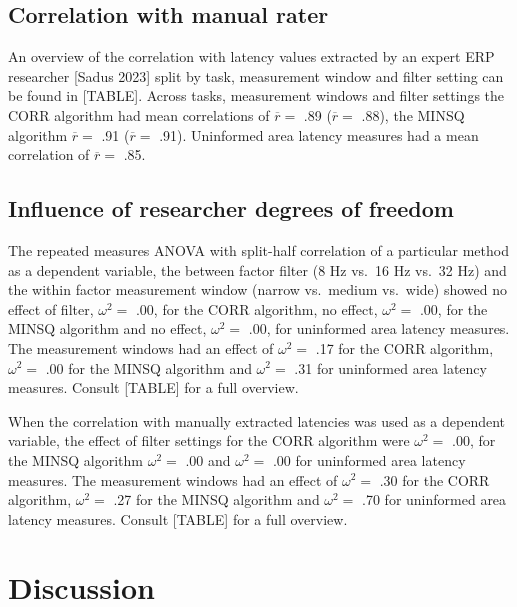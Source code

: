 \documentclass[
  man,floatsintext]{apa7}
\begin{document}
\hypertarget{correlation-with-manual-rater}{%
\subsection{Correlation with manual rater}\label{correlation-with-manual-rater}}

An overview of the correlation with latency values extracted by an expert ERP researcher {[}Sadus 2023{]} split by task, measurement window and filter setting can be found in {[}TABLE{]}. Across tasks, measurement windows and filter settings the CORR algorithm had mean correlations of \(\overline{r} =\) .89 (\(\overline{r} =\) .88), the MINSQ algorithm \(\overline{r} =\) .91 (\(\overline{r} =\) .91). Uninformed area latency measures had a mean correlation of \(\overline{r} =\) .85.

\hypertarget{influence-of-researcher-degrees-of-freedom}{%
\subsection{Influence of researcher degrees of freedom}\label{influence-of-researcher-degrees-of-freedom}}

The repeated measures ANOVA with split-half correlation of a particular method as a dependent variable, the between factor filter (8 Hz vs.~16 Hz vs.~32 Hz) and the within factor measurement window (narrow vs.~medium vs.~wide) showed no effect of filter, \(\omega^2 =\) .00, for the CORR algorithm, no effect, \(\omega^2 =\) .00, for the MINSQ algorithm and no effect, \(\omega^2 =\) .00, for uninformed area latency measures. The measurement windows had an effect of \(\omega^2 =\) .17 for the CORR algorithm, \(\omega^2 =\) .00 for the MINSQ algorithm and \(\omega^2 =\) .31 for uninformed area latency measures. Consult {[}TABLE{]} for a full overview.

When the correlation with manually extracted latencies was used as a dependent variable, the effect of filter settings for the CORR algorithm were \(\omega^2 =\) .00, for the MINSQ algorithm \(\omega^2 =\) .00 and \(\omega^2 =\) .00 for uninformed area latency measures. The measurement windows had an effect of \(\omega^2 =\) .30 for the CORR algorithm, \(\omega^2 =\) .27 for the MINSQ algorithm and \(\omega^2 =\) .70 for uninformed area latency measures. Consult {[}TABLE{]} for a full overview.

\hypertarget{discussion}{%
\section{Discussion}\label{discussion}}
\end{document}
